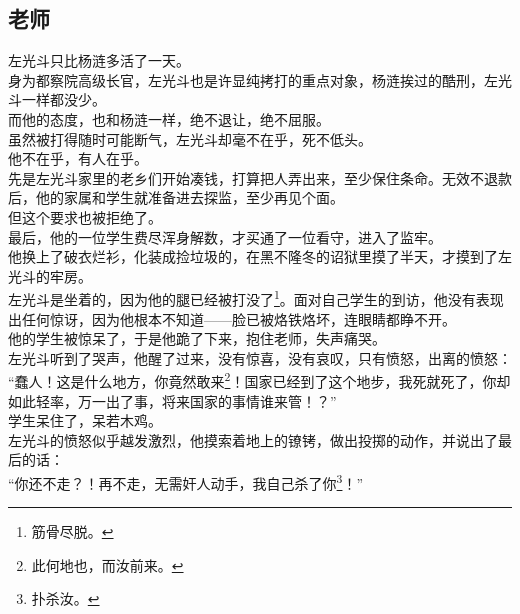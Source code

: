 	\begin{multicols}{\theparacolNo}
\fi
\subsection{老师}
左光斗只比杨涟多活了一天。\\

身为都察院高级长官，左光斗也是许显纯拷打的重点对象，杨涟挨过的酷刑，左光斗一样都没少。\\

而他的态度，也和杨涟一样，绝不退让，绝不屈服。\\

虽然被打得随时可能断气，左光斗却毫不在乎，死不低头。\\

他不在乎，有人在乎。\\

先是左光斗家里的老乡们开始凑钱，打算把人弄出来，至少保住条命。无效不退款后，他的家属和学生就准备进去探监，至少再见个面。\\

但这个要求也被拒绝了。\\

最后，他的一位学生费尽浑身解数，才买通了一位看守，进入了监牢。\\

他换上了破衣烂衫，化装成捡垃圾的，在黑不隆冬的诏狱里摸了半天，才摸到了左光斗的牢房。\\

左光斗是坐着的，因为他的腿已经被打没了\footnote{筋骨尽脱。}。面对自己学生的到访，他没有表现出任何惊讶，因为他根本不知道——脸已被烙铁烙坏，连眼睛都睁不开。\\

他的学生被惊呆了，于是他跪了下来，抱住老师，失声痛哭。\\

左光斗听到了哭声，他醒了过来，没有惊喜，没有哀叹，只有愤怒，出离的愤怒：\\

“蠢人！这是什么地方，你竟然敢来\footnote{此何地也，而汝前来。}！国家已经到了这个地步，我死就死了，你却如此轻率，万一出了事，将来国家的事情谁来管！？”\\

学生呆住了，呆若木鸡。\\

左光斗的愤怒似乎越发激烈，他摸索着地上的镣铐，做出投掷的动作，并说出了最后的话：\\

“你还不走？！再不走，无需奸人动手，我自己杀了你\footnote{扑杀汝。}！”\\


\end{multicols}
